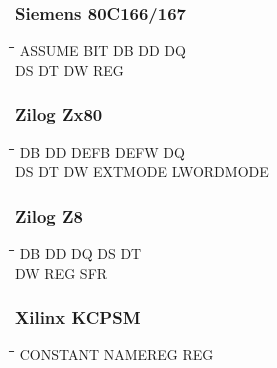\subsubsection{Siemens 80C166/167}
{\tt\begin{tabbing}
\hspace{3cm}\=\hspace{3cm}\=\hspace{3cm}\=\hspace{3cm}\=\kill
ASSUME     \> BIT         \> DB          \> DD          \> DQ \\
DS         \> DT          \> DW          \> REG \\
\end{tabbing}}

\subsubsection{Zilog Zx80}
{\tt\begin{tabbing}
\hspace{3cm}\=\hspace{3cm}\=\hspace{3cm}\=\hspace{3cm}\=\kill
DB         \> DD          \> DEFB        \> DEFW        \> DQ \\
DS         \> DT          \> DW          \> EXTMODE     \> LWORDMODE \\
\end{tabbing}}

\subsubsection{Zilog Z8}
{\tt\begin{tabbing}
\hspace{3cm}\=\hspace{3cm}\=\hspace{3cm}\=\hspace{3cm}\=\kill
DB         \> DD          \> DQ          \> DS          \> DT \\
DW         \> REG         \> SFR \\
\end{tabbing}}

\subsubsection{Xilinx KCPSM}
{\tt\begin{tabbing}
\hspace{3cm}\=\hspace{3cm}\=\hspace{3cm}\=\hspace{3cm}\=\kill
CONSTANT   \> NAMEREG     \> REG \\
\end{tabbing}}

